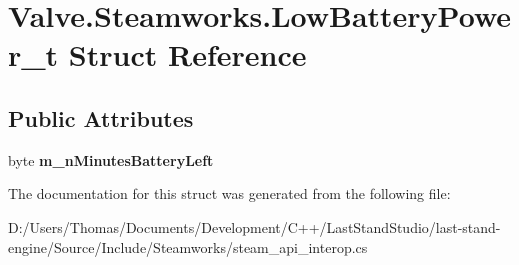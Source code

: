 \hypertarget{structValve_1_1Steamworks_1_1LowBatteryPower__t}{}\section{Valve.\+Steamworks.\+Low\+Battery\+Power\+\_\+t Struct Reference}
\label{structValve_1_1Steamworks_1_1LowBatteryPower__t}
\subsection*{Public Attributes}
\begin{DoxyCompactItemize}
\item 
\hypertarget{structValve_1_1Steamworks_1_1LowBatteryPower__t_a7b92eec92623c5a4a87a1a1e16435636}{}byte {\bfseries m\+\_\+n\+Minutes\+Battery\+Left}\label{structValve_1_1Steamworks_1_1LowBatteryPower__t_a7b92eec92623c5a4a87a1a1e16435636}

\end{DoxyCompactItemize}


The documentation for this struct was generated from the following file\+:\begin{DoxyCompactItemize}
\item 
D\+:/\+Users/\+Thomas/\+Documents/\+Development/\+C++/\+Last\+Stand\+Studio/last-\/stand-\/engine/\+Source/\+Include/\+Steamworks/steam\+\_\+api\+\_\+interop.\+cs\end{DoxyCompactItemize}
